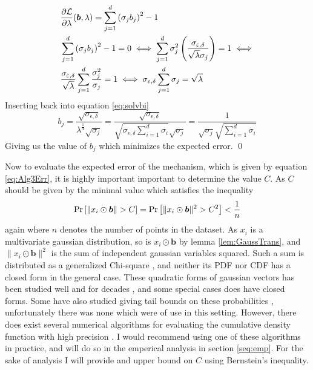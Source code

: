 \documentclass[a4paper,12pt]{article}
\renewenvironment{proof}{{\textit{Proof} \\}}{\qed}
\begin{document}
\begin{proof}
\begin{align*}
    &\frac{\partial \mathcal{L}}{\partial \lambda}(\bm{b},\lambda) = 
    \sum_{j=1}^d \left ( \sigma_j b_j\right)^2 - 1 \\
    &\sum_{j=1}^d \left ( \sigma_j b_j\right)^2 - 1 = 0 \iff
    \sum_{j=1}^d \sigma_j^2 \left (\frac{\sigma_{\varepsilon,\delta}}{\sqrt{\lambda}\sigma_j}\right) = 1 \iff \\
    &\frac{\sigma_{\varepsilon,\delta}}{\sqrt{\lambda}} \sum_{j=1}^d \frac{\sigma_j^2}{\sigma_j} = 1 \iff
    \sigma_{\varepsilon,\delta} \sum_{j=1}^d \sigma_j = \sqrt{\lambda}
\end{align*}
Inserting back into equation \eqref{eq:solvbi}
\[
    b_j = \frac{\sqrt{\sigma_{\epsilon,\delta}}}{\lambda^{\frac{1}{4}} \sqrt{\sigma_j}} =
    \frac{\sqrt{\sigma_{\epsilon,\delta}}}{\sqrt{\sigma_{\epsilon,\delta} \sum_{i=1}^d \sigma_i} \sqrt{\sigma_j}} = 
    \frac{1}{\sqrt{\sigma_j} \sqrt{\sum_{i=1}^d \sigma_i} } 
\]
Giving us the value of $b_j$ which minimizes the expected error.
\end{proof}

Now to evaluate the expected error of the mechanism, which is given by equation \eqref{eq:Alg3Err}, it is highly important important to determine the value $C$.
As $C$ should be given by the minimal value which satisfies the inequality
\[
   \Pr\left [ \| x_i \odot \bm{b} \| > C  \right] = \Pr\left [ \| x_i \odot \bm{b} \|^2 > C^2 \right] < \frac{1}{n}
\]
again where $n$ denotes the number of points in the dataset.
As $x_i$ is a multivariate gaussian distribution, so is $x_i \odot \bm{b}$ by lemma \ref{lem:GaussTrans}, and $\|x_i \odot \bm{b}\|^2$ is the sum of independent gaussian variables squared.
Such a sum is distributed as a generalized Chi-square \cite{GenChiSq}, and neither its PDF nor CDF has a closed form in the general case.
These quadratic forms of gaussian vectors has been studied well and for decades \cite{MathaiQaudForms}, and some special cases does have closed forms.
Some have also studied giving tail bounds on these probabilities \cite{QaudFormsBounds}, unfortunately there was none which were of use in this setting.
However, there does exist several numerical algorithms for evaluating the cumulative density function with high precision \cite{QuadFormsNume}. 
I would recommend using one of these algorithms in practice, and will do so in the emperical analysis in section \ref{seq:emp}.
For the sake of analysis I will provide and upper bound on $C$ using Bernstein's inequality.
\end{document}
